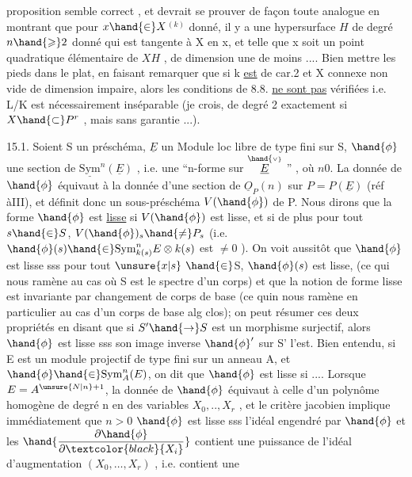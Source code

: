 
proposition semble correct , et devrait se prouver de façon toute analogue
en montrant que pour $x\hand{\in} X$$^{(k)}$ donné, il y a une hypersurface $H$ de degré $n\hand{\geqslant} 2$
donné qui est tangente à X en x, et telle que x soit un point quadratique
élémentaire de $X$\hand{$\cap$}$H$ , de dimension une de moins .... Bien mettre les
pieds dans le plat, en faisant remarquer que si k \uline{est} de car.2 et X
connexe non vide de dimension impaire, alors les conditions de 8.8. \uline{ne sont pas}
vérifiées i.e. L/K est nécessairement inséparable (je crois, de degré
2 exactement si $X\hand{\subset} P^r$ , mais sans garantie ...).

15.1. Soient S un préschéma, $\underline{E}$ un Module loc libre de type fini
sur S, $\hand{\phi}$ une section de $\underline{\mathrm{Sym}}^n(\underline{E})$ , i.e. une ``n-forme sur $\overset{\hand{\scriptscriptstyle\vee}}{\underline{E}}$ '' , où $n$\unsure{$\geqslant$}$0$.
La donnée de $\hand{\phi}$ équivaut à la donnée d'une section de $\underline{O}_P(n)$ sur $P=P(\underline{E})$
(réf àIII), et définit donc un sous-préschéma $V(\hand{\phi})$ de P. Nous dirons que
la forme $\hand{\phi}$ est \uline{lisse} si $V(\hand{\phi})$ est lisse, et si de plus pour tout $s\hand{\in} S$,
$V(\hand{\phi})_s\hand{\neq} P_s$ (i.e. $\hand{\phi}(s)\hand{\in} \mathrm{Sym}^n_{k(s)}E\otimes k(s)$ est $\neq$\hand{\unsure{(}}$0$ ). On voit aussitôt
que $\hand{\phi}$ est lisse sss pour tout $\unsure{x|s}$ $\hand{\in}$S, $\hand{\phi}(s)$ est lisse, 
(ce qui nous ramène au cas où S est le spectre d'un corps) et
que la notion de forme lisse est invariante par changement de corps de
base (ce quin nous ramène en particulier au cas d'un corps de base alg
clos); on peut résumer ces deux propriétés en disant que si $S'\hand{\to} S$ est
un morphisme surjectif, alors $\hand{\phi}$ est lisse sss son image inverse $\hand{\phi}'$ sur S'
l'est. Bien entendu, si E est un module projectif de type fini sur un
anneau A, et $\hand{\phi}\hand{\in}\mathrm{Sym}^n_A(E)$, on dit que $\hand{\phi}$ est lisse si .... Lorsque $E=A^{\unsure{N|n}+1}$,
la donnée de $\hand{\phi}$ équivaut à celle d'un polynôme homogène de degré n
en des variables $X_0,..,X_r$ , et le critère jacobien implique immédiatement
que  $n>0$ $\hand{\phi}$ est lisse sss l'idéal engendré par $\hand{\phi}$ et les $\hand{\dfrac{\partial\hand{\phi}}{\partial\textcolor{black}{X_i}}}$ contient
une puissance de l'idéal d'augmentation $(X_0,\dots,X_r)$ , i.e. contient une

 
